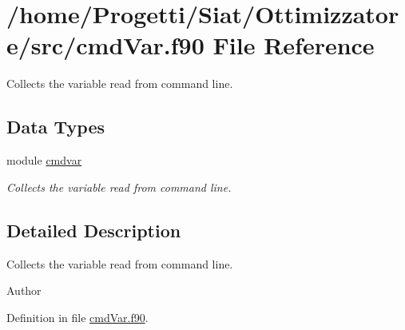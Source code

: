 \hypertarget{cmd_var_8f90}{\section{/home/\-Progetti/\-Siat/\-Ottimizzatore/src/cmd\-Var.f90 File Reference}
\label{cmd_var_8f90}
}


Collects the variable read from command line.  


\subsection*{Data Types}
\begin{DoxyCompactItemize}
\item 
module \hyperlink{classcmdvar}{cmdvar}
\begin{DoxyCompactList}\small\item\em Collects the variable read from command line. \end{DoxyCompactList}\end{DoxyCompactItemize}


\subsection{Detailed Description}
Collects the variable read from command line. \begin{DoxyAuthor}{Author}

\end{DoxyAuthor}


Definition in file \hyperlink{cmd_var_8f90_source}{cmd\-Var.\-f90}.

